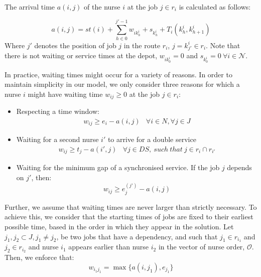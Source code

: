 \documentclass[a4paper,11pt]{elsarticle}
\begin{document}
The arrival time $a(i,j)$ of the nurse $i$ at the job $j \in r_i$ is calculated as follows:

\begin{equation}
    a(i,j) = st(i) + \sum_{h \in 0}^{j' - 1} w_{ik^i_h} + s_{k^i_h} + T_i(k^i_h, k^i_{h + 1})
\end{equation}
Where $j'$ denotes the position of job $j$ in the route $r_i$, \ie $j = k^i_{j'} \in r_i$. Note that there is not waiting or service times at the depot, \ie $w_{ik^i_0} = 0$ and $s_{k^i_0} = 0 \ \forall i \in \mathcal{N}$.

In practice, waiting times might occur for a variety of reasons. In order to maintain simplicity in our model, we only consider three reasons for which a nurse $i$ might have waiting time $w_{ij} \geq 0$ at the job $j \in r_i$:
\begin{itemize}
    \item Respecting a time window: 
    \begin{align}
        w_{ij} \geq e_i - a(i,j) & \forall i \in N, \forall j \in J
    \end{align}
    \item Waiting for a second nurse $i'$ to arrive for a double service
    \begin{align}
        w_{i j} \geq t_j - a(i',j) & \forall j \in DS,\ such\ that\ j \in r_{i} \cap r_{i'}
    \end{align}
    \item Waiting for the minimum gap of a synchronised service. If the job $j$ depends on $j'$, then:
    \begin{equation}\label{eq:waiting_for_synchronised}
        w_{ij} \geq e^{(j')}_{j} - a(i,j)
    \end{equation}
\end{itemize}

Further, we assume that waiting times are never larger than strictly necessary. To achieve this, we consider that the starting times of jobs are fixed to their earliest possible time, based  in the order in which they appear in the solution. Let $j_1, j_2 \subset J, j_1 \neq j_2$, be two jobs that have a dependency, and such that $j_1 \in r_{i_1}$ and $j_2 \in r_{i_2}$ and nurse $i_1$ appears earlier than nurse $i_2$ in the vector of nurse order, $\mathcal{O}$. Then, we enforce that:
\begin{equation}\label{eq:earliest_possible_start_assumption}
    w_{i_1 j_1} = \max \{ a(i,j_1), e_{j_1} \}
\end{equation}
\end{document}
